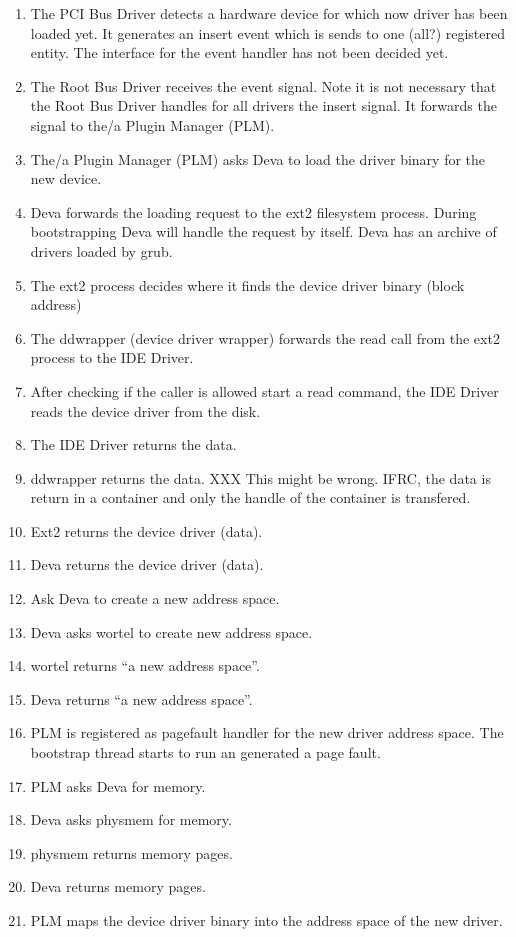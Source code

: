 \begin{enumerate}
\item The PCI Bus Driver detects a hardware device for which now driver
has been loaded yet.  It generates an insert event which is sends to
one (all?) registered entity.  The interface for the event handler has
not been decided yet.
\item The Root Bus Driver receives the event signal.  Note it is not
necessary that the Root Bus Driver handles for all drivers the insert
signal.  It forwards the signal to the/a Plugin Manager (PLM).
\item The/a Plugin Manager (PLM) asks Deva to load the driver binary
for the new device.
\item Deva forwards the loading request to the ext2 filesystem
process.  During bootstrapping Deva will handle the request by itself.
Deva has an archive of drivers loaded by grub.
\item The ext2 process decides where it finds the device driver binary
(block address)
\item The ddwrapper (device driver wrapper) forwards the read call
from the ext2 process to the IDE Driver.
\item After checking if the caller is allowed start a read command,
the IDE Driver reads the device driver from the disk.
\item The IDE Driver returns the data.
\item ddwrapper returns the data. XXX This might be wrong.  IFRC, the
data is return in a container and only the handle of the container is
transfered.
\item Ext2 returns the device driver (data).
\item Deva returns the device driver (data).
\item Ask Deva to create a new address space.
\item Deva asks wortel to create new address space.
\item wortel returns ``a new address space''.
\item Deva returns ``a new address space''.
\item PLM is registered as pagefault handler for the new driver
address space.  The bootstrap thread starts to run an generated a
page fault.
\item PLM asks Deva for memory.
\item Deva asks physmem for memory.
\item physmem returns memory pages.
\item Deva returns memory pages.
\item PLM maps the device driver binary into the address space of the
new driver.
\end{enumerate}
